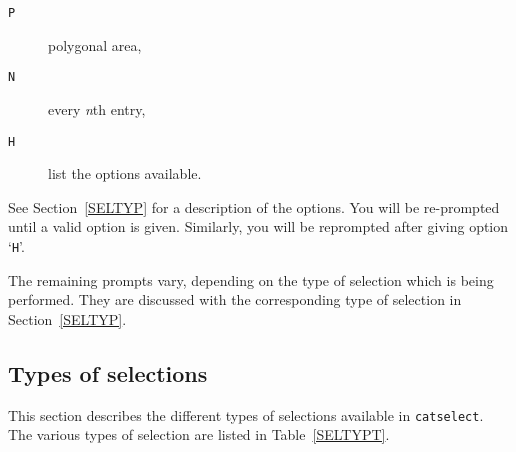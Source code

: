 \documentclass[twoside,11pt]{starlink}
\begin{document}
\begin{description}
\begin{description}
    \item[ \texttt{P} ] polygonal area,

    \item[ \texttt{N} ] every \textit{n}th entry,

    \item[ \texttt{H} ] list the options available.

  \end{description}

   See Section~\ref{SELTYP} for a description of the options.  You will
   be re-prompted until a valid option is given.  Similarly, you will be
   reprompted after giving option `\texttt{H}'.

\end{description}

The remaining prompts vary, depending on the type of selection which is
being performed.  They are discussed with the corresponding type of
selection in Section~\ref{SELTYP}.

\subsection{\label{SELTYP}Types of selections}

This section describes the different types of selections available in
\texttt{catselect}.  The various types of selection are listed in
Table~\ref{SELTYPT}.
\end{document}
